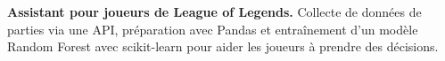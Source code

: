 
\begin{cvparagraph}
\noindent\textbf{Assistant pour joueurs de League of Legends.} Collecte de données de parties via une API, préparation avec Pandas et entraînement d’un modèle Random Forest avec scikit-learn pour aider les joueurs à prendre des décisions.
\end{cvparagraph}
